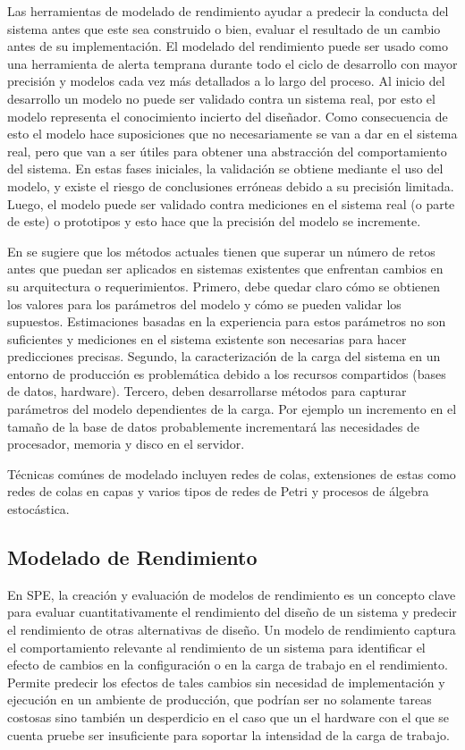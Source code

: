 \documentclass[article]{IEEEtran}
\begin{document}
Las herramientas de modelado de rendimiento ayudar a predecir la conducta del sistema antes que este sea construido o bien, evaluar el resultado de un cambio antes de su implementación. El modelado del rendimiento puede ser usado como una herramienta de alerta temprana durante todo el ciclo de desarrollo con mayor precisión y modelos cada vez más detallados a lo largo del proceso. Al inicio del desarrollo un modelo no puede ser validado contra un sistema real, por esto el modelo representa el conocimiento incierto del diseñador. Como consecuencia de esto el modelo hace suposiciones que no necesariamente se van a dar en el sistema real, pero que van a ser útiles para obtener una abstracción del comportamiento del sistema. En estas fases iniciales, la validación se obtiene mediante el uso del modelo, y existe el riesgo de conclusiones erróneas debido a su precisión limitada. Luego, el modelo puede ser validado contra mediciones en el sistema real (o parte de este) o prototipos y esto hace que la precisión del modelo se incremente.

En \cite{jit-et-al} se sugiere que los métodos actuales tienen que superar un número de retos antes que puedan ser aplicados en sistemas existentes que enfrentan cambios en su arquitectura o requerimientos. Primero, debe quedar claro cómo se obtienen los valores para los parámetros del modelo y cómo se pueden validar los supuestos. Estimaciones basadas en la experiencia para estos parámetros no son suficientes y mediciones en el sistema existente son necesarias para hacer predicciones precisas. Segundo, la caracterización de la carga del sistema en un entorno de producción es problemática debido a los recursos compartidos (bases de datos, hardware). Tercero, deben desarrollarse métodos para capturar parámetros del modelo dependientes de la carga. Por ejemplo un incremento en el tamaño de la base de datos probablemente incrementará las necesidades de procesador, memoria y disco en el servidor.

Técnicas comúnes de modelado incluyen redes de colas, extensiones de estas como redes de colas en capas y varios tipos de redes de Petri y procesos de álgebra estocástica.


\subsection{Modelado de Rendimiento}
En SPE, la creación y evaluación de modelos de rendimiento es un concepto clave para evaluar cuantitativamente el rendimiento del diseño de un sistema y predecir el rendimiento de otras alternativas de diseño. Un modelo de rendimiento captura el comportamiento relevante al rendimiento de un sistema para identificar el efecto de cambios en la configuración o en la carga de trabajo en el rendimiento. Permite predecir los efectos de tales cambios sin necesidad de implementación y ejecución en un ambiente de producción, que podrían ser no solamente tareas costosas sino también un desperdicio en el caso que un el hardware con el que se cuenta pruebe ser insuficiente para soportar la intensidad de la carga de trabajo.\cite{noorshams}
\end{document}
